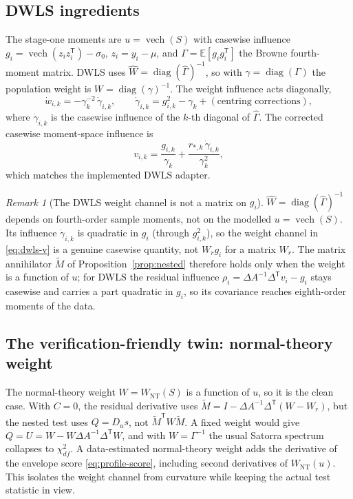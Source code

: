 \documentclass[11pt]{article}
\newcommand{\E}{\mathbb{E}}
\newcommand{\vech}{\operatorname{vech}}
\newcommand{\diag}{\operatorname{diag}}
\newcommand{\T}{^{\mathsf{T}}}
\newcommand{\Wr}{W_{\!r}}
\theoremstyle{plain}
\theoremstyle{remark}
\newtheorem*{remark}{Remark}
\begin{document}
\subsection{DWLS ingredients}
The stage-one moments are $u=\vech(S)$ with casewise influence $g_{i}=\vech(z_{i}
z_{i}\T)-\sigma_{0}$, $z_{i}=y_{i}-\mu$, and $\Gamma=\E[g_{i}g_{i}\T]$ the Browne
fourth-moment matrix. DWLS uses $\widehat W=\diag(\widehat\Gamma)^{-1}$, so with
$\gamma=\diag(\Gamma)$ the population weight is $W=\diag(\gamma)^{-1}$. The weight
influence acts diagonally,
\[
  \dot w_{i,k}=-\gamma_{k}^{-2}\,\dot\gamma_{i,k},\qquad
  \dot\gamma_{i,k}=g_{i,k}^{2}-\gamma_{k}+(\text{centring corrections}),
\]
where $\dot\gamma_{i,k}$ is the casewise influence of the $k$-th diagonal of
$\widehat\Gamma$. The corrected casewise moment-space influence is
\begin{equation}
  v_{i,k}=\frac{g_{i,k}}{\gamma_{k}}
          +\frac{r_{*,k}\,\dot\gamma_{i,k}}{\gamma_{k}^{2}},
  \label{eq:dwls-v}
\end{equation}
which matches the implemented DWLS adapter.

\begin{remark}[The DWLS weight channel is not a matrix on $g_{i}$]
$\widehat W=\diag(\widehat\Gamma)^{-1}$ depends on fourth-order sample moments,
not on the modelled $u=\vech(S)$. Its influence $\dot\gamma_{i,k}$ is quadratic
in $g_{i}$ (through $g_{i,k}^{2}$), so the weight channel in \eqref{eq:dwls-v} is
a genuine casewise quantity, not $\Wr g_{i}$ for a matrix $\Wr$. The matrix
annihilator $\widetilde M$ of Proposition~\ref{prop:nested} therefore holds only
when the weight is a function of $u$; for DWLS the residual influence
$\rho_{i}=\Delta A^{-1}\Delta\T v_{i}-g_{i}$ stays casewise and carries a part
quadratic in $g_{i}$, so its covariance reaches eighth-order moments of the data.
\end{remark}

\subsection{The verification-friendly twin: normal-theory weight}
The normal-theory weight $W=W_{\mathrm{NT}}(S)$ is a function of $u$, so it is the
clean case. With $C=0$, the residual derivative uses
$\widetilde M=I-\Delta A^{-1}\Delta\T(W-\Wr)$, but the nested test uses
$Q=D_{u}s$, not $\widetilde M\T W\widetilde M$. A fixed weight would give
$Q=U=W-W\Delta A^{-1}\Delta\T W$, and with $W=\Gamma^{-1}$ the usual Satorra
spectrum collapses to $\chi^{2}_{df}$. A data-estimated normal-theory weight
adds the derivative of the envelope score \eqref{eq:profile-score}, including
second derivatives of $W_{\mathrm{NT}}(u)$. This isolates the weight channel from
curvature while keeping the actual test statistic in view.
\end{document}
